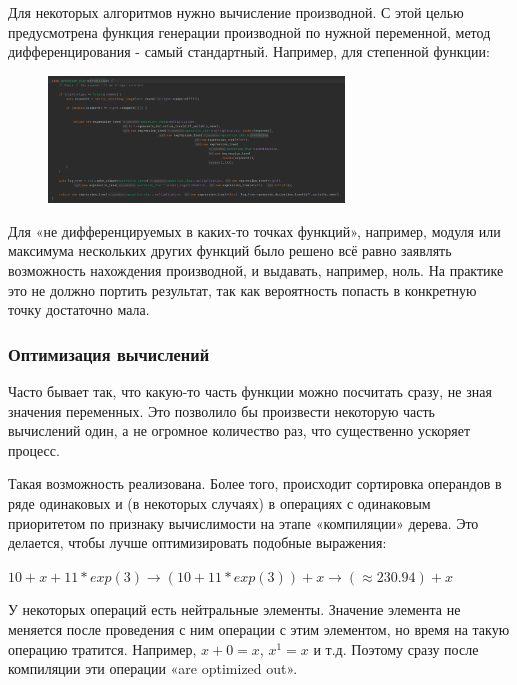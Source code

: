 \documentclass[11pt]{article}
\begin{document}
    Для некоторых алгоритмов нужно вычисление производной.
    С этой целью предусмотрена функция генерации производной по нужной переменной, метод дифференцирования - самый стандартный.
    Например, для степенной функции:
    \begin{figure}[h]
        \centering
        \includegraphics[width=0.7\textwidth]{involution_derivative.png}
        \label{fig:involution-derivative}
    \end{figure}
    \FloatBarrier

    Для «не дифференцируемых в каких-то точках функций», например,
    модуля или максимума нескольких других функций было решено всё равно заявлять возможность нахождения производной,
    и выдавать, например, ноль.
    На практике это не должно портить результат,
    так как вероятность попасть в конкретную точку достаточно мала.

    \subsubsection{Оптимизация вычислений}
    Часто бывает так, что какую-то часть функции можно посчитать сразу, не зная значения переменных.
    Это позволило бы произвести некоторую часть вычислений один, а не огромное количество раз, что существенно ускоряет процесс.

    Такая возможность реализована.
    Более того, происходит сортировка операндов в ряде одинаковых и (в некоторых случаях) в операциях с одинаковым приоритетом
    по признаку вычислимости на этапе «компиляции» дерева.
    Это делается, чтобы лучше оптимизировать подобные выражения:

    $10 + x + 11 * exp(3) \longrightarrow (10 + 11 * exp(3)) + x \longrightarrow (\approx 230.94) + x$

    У некоторых операций есть нейтральные элементы.
    Значение элемента не меняется после проведения с ним операции с этим элементом,
    но время на такую операцию тратится.
    Например, $x + 0 = x$, $x^1 = x$ и т.д.
    Поэтому сразу после компиляции эти операции «are optimized out».
\end{document}
